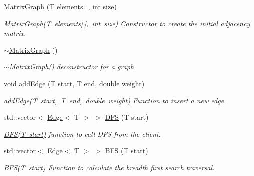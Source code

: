 \begin{DoxyCompactItemize}
\item 
\mbox{\hyperlink{class_matrix_graph_a388cdebfe849fd7f1b5bb48638b097d0}{Matrix\+Graph}} (T elements\mbox{[}$\,$\mbox{]}, int size)
\begin{DoxyCompactList}\small\item\em \mbox{\hyperlink{class_matrix_graph_a388cdebfe849fd7f1b5bb48638b097d0}{Matrix\+Graph(\+T elements\mbox{[}$\,$\mbox{]}, int size)}} Constructor to create the initial adjacency matrix. \end{DoxyCompactList}\item 
\mbox{\hyperlink{class_matrix_graph_ab84318948ee00c6d4ee05bf3506e17b2}{$\sim$\+Matrix\+Graph}} ()
\begin{DoxyCompactList}\small\item\em \mbox{\hyperlink{class_matrix_graph_ab84318948ee00c6d4ee05bf3506e17b2}{$\sim$\+Matrix\+Graph()}} deconstructor for a graph \end{DoxyCompactList}\item 
void \mbox{\hyperlink{class_matrix_graph_ac8410c5005729bdc4783429962446cad}{add\+Edge}} (T start, T end, double weight)
\begin{DoxyCompactList}\small\item\em \mbox{\hyperlink{class_matrix_graph_ac8410c5005729bdc4783429962446cad}{add\+Edge(\+T start, T end, double weight)}} Function to insert a new edge \end{DoxyCompactList}\item 
std\+::vector$<$ \mbox{\hyperlink{struct_edge}{Edge}}$<$ T $>$ $>$ \mbox{\hyperlink{class_matrix_graph_ac6f0cc48b7826d606bd951f193ddbffb}{D\+FS}} (T start)
\begin{DoxyCompactList}\small\item\em \mbox{\hyperlink{class_matrix_graph_ac6f0cc48b7826d606bd951f193ddbffb}{D\+F\+S(\+T start)}} function to call D\+FS from the client. \end{DoxyCompactList}\item 
std\+::vector$<$ \mbox{\hyperlink{struct_edge}{Edge}}$<$ T $>$ $>$ \mbox{\hyperlink{class_matrix_graph_a3beaf5181ebc3e8f9c0d9610578b5ea3}{B\+FS}} (T start)
\begin{DoxyCompactList}\small\item\em \mbox{\hyperlink{class_matrix_graph_a3beaf5181ebc3e8f9c0d9610578b5ea3}{B\+F\+S(\+T start)}} Function to calculate the breadth first search traversal. \end{DoxyCompactList}\item 

\end{DoxyCompactItemize}
